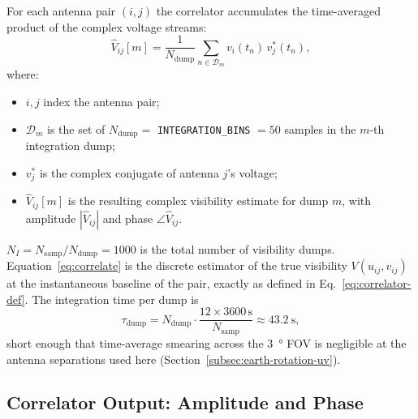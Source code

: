 For each antenna pair $(i,j)$ the correlator accumulates the time-averaged
product of the complex voltage streams:
\begin{equation}
  \hat{V}_{ij}[m] = \frac{1}{N_{\mathrm{dump}}}
    \sum_{n\in\mathcal{D}_m} v_i(t_n)\,v_j^{*}(t_n),
  \label{eq:correlate}
\end{equation}
where:
\begin{itemize}[leftmargin=1.5em,itemsep=1pt,topsep=2pt]
  \item $i,j$ index the antenna pair;
  \item $\mathcal{D}_m$ is the set of $N_{\mathrm{dump}} = $
        \texttt{INTEGRATION\_BINS} $= 50$ samples in the $m$-th integration
        dump;
  \item $v_j^*$ is the complex conjugate of antenna $j$'s voltage;
  \item $\hat{V}_{ij}[m]$ is the resulting complex visibility estimate for
        dump $m$, with amplitude $|\hat{V}_{ij}|$ and phase
        $\angle\hat{V}_{ij}$.
\end{itemize}
$N_I = N_{\mathrm{samp}}/N_{\mathrm{dump}} = 1000$ is the total number of
visibility dumps. Equation~\eqref{eq:correlate} is the discrete estimator of
the true visibility $V(u_{ij},v_{ij})$ at the instantaneous baseline of the
pair, exactly as defined in Eq.~\eqref{eq:correlator-def}. The integration
time per dump is
\begin{equation}
  \tau_{\mathrm{dump}} = N_{\mathrm{dump}}\cdot\frac{12\times 3600\,\mathrm{s}}{N_{\mathrm{samp}}}
                  \approx \SI{43.2}{\second},
\end{equation}
short enough that time-average smearing across the \SI{3}{\degree} FOV is
negligible at the antenna separations used here
(Section~\ref{subsec:earth-rotation-uv}).

\subsection{Correlator Output: Amplitude and Phase}
\label{subsec:corr-output}

